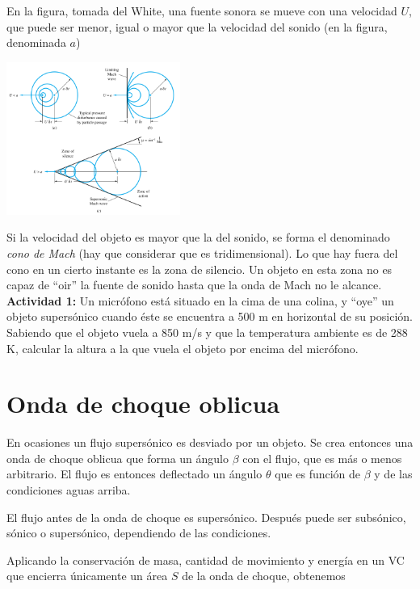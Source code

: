 	
	En la figura, tomada del White\cite{White2008}, una fuente sonora
	se mueve con una velocidad $U$, que puede ser menor, igual o mayor
	que la velocidad del sonido (en la figura, denominada $a$)
	
	\begin{center}
		\includegraphics[height=5cm]{TeX_files/chapter11-Compresible/cono_de_Mach}
		\par\end{center}
	
	
	Si la velocidad del objeto es mayor que la del sonido, se forma el
	denominado \emph{cono de Mach }(hay que considerar que es tridimensional).
	Lo que hay fuera del cono en un cierto instante es la zona de silencio.
	Un objeto en esta zona no es capaz de ``oir'' la fuente de sonido
	hasta que la onda de Mach no le alcance.
	\textbf{Actividad 1:}
		Un micrófono está situado en la cima de una colina, y ``oye''
		un objeto supersónico cuando éste se encuentra a 500 m en horizontal
		de su posición. Sabiendo que el objeto vuela a 850 m/s y que la temperatura
		ambiente es de 288 K, calcular la altura a la que vuela el objeto
		por encima del micrófono.


\section{Onda de choque oblicua}

	
	En ocasiones un flujo supersónico es desviado por un objeto. Se crea
	entonces una onda de choque oblicua que forma un ángulo $\beta$ con
	el flujo, que es más o menos arbitrario. El flujo es entonces deflectado
	un ángulo $\theta$ que es función de $\beta$ y de las condiciones
	aguas arriba. 
	
	El flujo antes de la onda de choque es supersónico. Después puede
	ser subsónico, sónico o supersónico, dependiendo de las condiciones.
	
	Aplicando la conservación de masa, cantidad de movimiento y energía
	en un VC que encierra únicamente un área $S$ de la onda de choque,
	obtenemos
	
